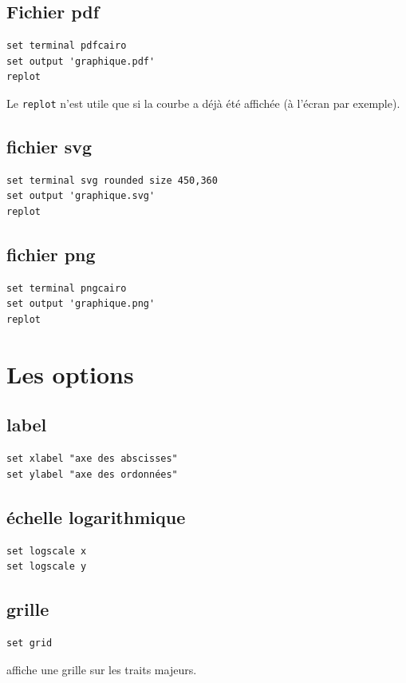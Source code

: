 \documentclass[a4paper,twoside]{article}
\begin{document}
\subsection{Fichier pdf}
\begin{verbatim}
set terminal pdfcairo
set output 'graphique.pdf'
replot
\end{verbatim}

\begin{remarque}
Le \texttt{replot} n'est utile que si la courbe a déjà été affichée (à l'écran par exemple).
\end{remarque}

\subsection{fichier svg}
\begin{verbatim}
set terminal svg rounded size 450,360
set output 'graphique.svg'
replot
\end{verbatim}

\subsection{fichier png}
\begin{verbatim}
set terminal pngcairo
set output 'graphique.png'
replot
\end{verbatim}


\section{Les options}
\subsection{label}
\begin{verbatim}
set xlabel "axe des abscisses"
set ylabel "axe des ordonnées"
\end{verbatim}

\subsection{échelle logarithmique}
\begin{verbatim}
set logscale x
set logscale y
\end{verbatim}

\subsection{grille}
\begin{verbatim}
set grid
\end{verbatim}
affiche une grille sur les traits majeurs.
\end{document}
